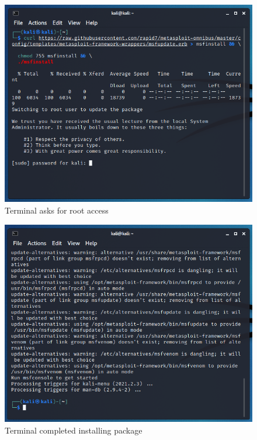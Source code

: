 \documentclass[a4paper, 12pt, titlepage]{report}
\begin{document}
\begin{figure}[H]
    \centering
    \includegraphics[scale=0.5]{pics/meta2.PNG}
    \caption{Terminal asks for root access}
\end{figure}
\begin{figure}[H]
    \centering
    \includegraphics[scale=0.5]{pics/meta3.PNG}
    \caption{Terminal completed installing package}
    \label{fig:fig11}
\end{figure}
\end{document}
